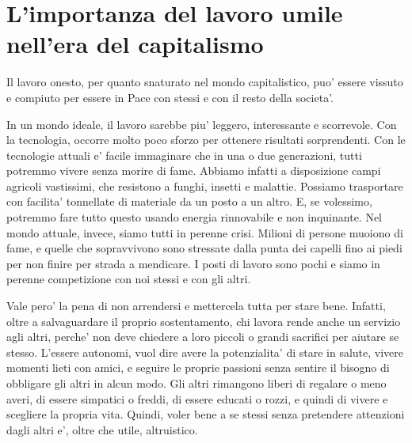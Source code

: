 \chapter{L'importanza del lavoro umile nell'era del capitalismo}
\label{altruismoLavoro}

Il lavoro onesto, per quanto snaturato nel mondo capitalistico, puo' essere vissuto e compiuto per essere in Pace con stessi e con il resto della societa'. 

In un mondo ideale, il lavoro sarebbe piu' leggero, interessante e scorrevole. Con la tecnologia, occorre molto poco sforzo per ottenere risultati sorprendenti. Con le tecnologie attuali e' facile immaginare che in una o due generazioni, tutti potremmo vivere senza morire di fame. Abbiamo infatti a disposizione campi agricoli vastissimi, che resistono a funghi, insetti e malattie. Possiamo trasportare con facilita' tonnellate di materiale da un posto a un altro. E, se volessimo, potremmo fare tutto questo usando energia rinnovabile e non inquinante. Nel mondo attuale, invece, siamo tutti in perenne crisi. Milioni di persone muoiono di fame, e quelle che sopravvivono sono stressate dalla punta dei capelli fino ai piedi per non finire per strada a mendicare. I posti di lavoro sono pochi e siamo in perenne competizione con noi stessi e con gli altri.

Vale pero' la pena di non arrendersi e mettercela tutta per stare bene. Infatti, oltre a salvaguardare il proprio sostentamento, chi lavora rende anche un servizio agli altri, perche' non deve chiedere a loro piccoli o grandi sacrifici per aiutare se stesso. 
L'essere autonomi, vuol dire avere la potenzialita' di stare in salute, vivere momenti lieti con amici, e seguire le proprie passioni senza sentire il bisogno di obbligare gli altri in alcun modo. Gli altri rimangono liberi di regalare o meno averi, di essere simpatici o freddi, di essere educati o rozzi, e quindi di vivere e scegliere la propria vita.
Quindi, voler bene a se stessi senza pretendere attenzioni dagli altri e', oltre che utile, altruistico. 

